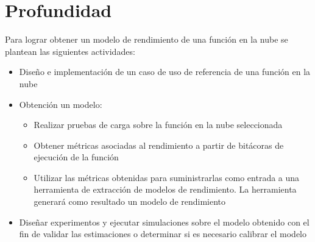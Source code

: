 \section{Profundidad}
Para lograr obtener un modelo de rendimiento de una función en la nube se plantean las siguientes actividades:
\begin{itemize}
    \item Diseño e implementación de un caso de uso de referencia de una función en la nube 
    \item Obtención un modelo:
    \begin{itemize}
        \item Realizar pruebas de carga sobre la función en la nube seleccionada
        \item Obtener métricas asociadas al rendimiento a partir de bitácoras de ejecución de la función
        \item Utilizar las métricas obtenidas para suministrarlas como entrada a una herramienta de extracción de modelos de rendimiento. La herramienta generará como resultado un modelo de rendimiento
    \end{itemize}
    \item Diseñar experimentos y ejecutar simulaciones sobre el modelo obtenido con el fin de validar las estimaciones o determinar si es necesario calibrar el modelo
    
\end{itemize}




